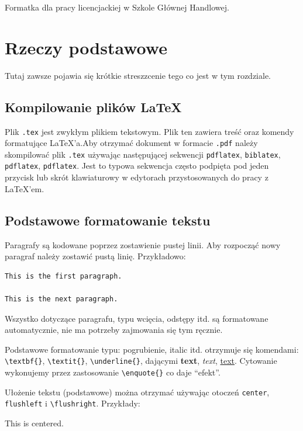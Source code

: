 \documentclass[polish, twoside, 12pt, a4paper]{article}
\theoremstyle{definition}
\theoremstyle{plain}
\theoremstyle{remark}
\begin{document}
Formatka dla pracy licencjackiej w Szkole Głównej Handlowej.

\clearpage
\section{Rzeczy podstawowe}

Tutaj zawsze pojawia się krótkie streszzcenie tego co jest w tym rozdziale.

\subsection{Kompilowanie plików \LaTeX}

Plik  \verb+.tex+ jest zwykłym plikiem tekstowym. Plik ten zawiera treść oraz komendy formatujące \LaTeX'a.Aby otrzymać dokument w formacie \verb+.pdf+ należy skompilować plik \verb+.tex+ używając następującej sekwencji \verb+pdflatex+, \verb+biblatex+, \verb+pdflatex+, \verb+pdflatex+. Jest to typowa sekwencja często podpięta pod jeden przycisk lub skrót klawiaturowy w edytorach przystosowanych do pracy z \LaTeX'em.

\subsection{Podstawowe formatowanie tekstu}

Paragrafy są kodowane poprzez zostawienie pustej linii. Aby rozpocząć nowy paragraf należy zostawić pustą linię. Przykładowo:
\begin{verbatim}
This is the first paragraph.

This is the next paragraph.
\end{verbatim}

Wszystko dotyczące paragrafu, typu wcięcia, odstępy itd. są formatowane automatycznie, nie ma potrzeby zajmowania się tym ręcznie.

Podstawowe formatowanie typu: pogrubienie, italic itd. otrzymuje się komendami: \verb+\textbf{}+, \verb+\textit{}+, \verb+\underline{}+, dającymi \textbf{text}, \textit{text}, \underline{text}. Cytowanie wykonujemy przez zastosowanie \verb+\enquote{}+ co daje \enquote{efekt}.

Ułożenie tekstu (podstawowe) można otrzymać używając otoczeń \verb+center+, \verb+flushleft+ i \verb+\flushright+. Przykłady:

\begin{center}
  This is centered.
\end{center}
\end{document}
